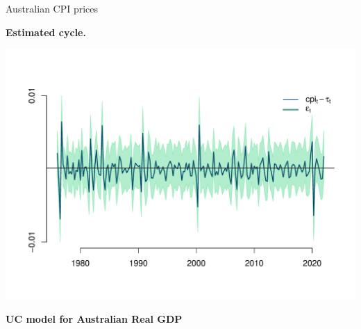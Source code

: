 \documentclass[notes,blackandwhite,mathsans,usenames,dvipsnames]{beamer}
\begin{document}
\begin{frame}{Australian CPI prices}

\centering
\smallskip\textbf{Estimated cycle.}

\includegraphics[scale=0.65, trim=2cm 0.5cm 2cm 2cm]{results/cpi-uc-tvpdrift-epsilon.pdf}

\end{frame}











{
\begin{frame}

\begin{adjustwidth}{-0.5cm}{0cm}
\vspace{8.3cm}\Large
\textbf{{\color{mcxs3}UC model for} {\color{mcxs1}Australian Real GDP}}
\end{adjustwidth}

\end{frame}
}
\end{document}

